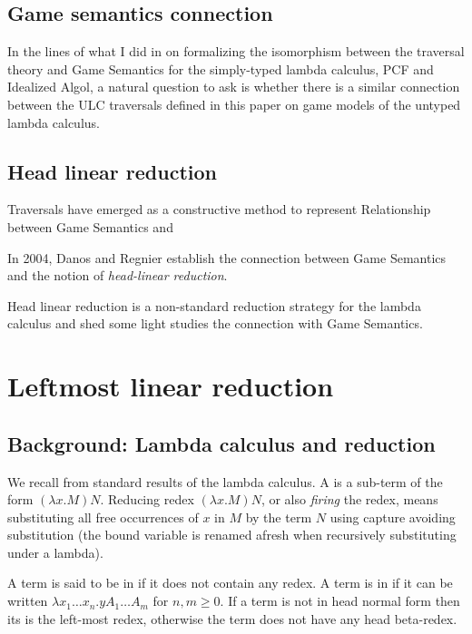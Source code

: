 \documentclass{article}
\theoremstyle{definition}
\begin{document}
\subsection{Game semantics connection}

In the lines of what I did in \cite{BlumPhd} on formalizing the isomorphism between the traversal theory and Game Semantics for the simply-typed lambda calculus, PCF and Idealized Algol, a natural question to ask is whether there is a similar connection between the ULC traversals defined in this paper on game models of the untyped lambda calculus.


\subsection{Head linear reduction}

Traversals have emerged as a constructive method to represent
Relationship between Game Semantics and

In 2004, Danos and Regnier \cite{danos-head} establish the connection between Game Semantics and the notion of \emph{head-linear reduction}.

Head linear reduction is  a non-standard reduction strategy for the lambda calculus and shed some light studies the connection with Game Semantics.


\section{Leftmost linear reduction}
\label{sec:leftmostlinearred}

\subsection{Background: Lambda calculus and reduction}
We recall from standard results of the lambda calculus.
A  is a sub-term of the form $(\lambda x. M) N$.
Reducing redex $(\lambda x. M) N$, or also \emph{firing} the redex, means substituting all free occurrences of $x$ in $M$ by the term $N$ using capture avoiding substitution (the bound variable is renamed afresh when recursively substituting under a lambda).

A term is said to be in  if it does not contain any redex.
A term is in  if it can be written $\lambda x_1 \ldots x_n . y A_1 \ldots A_m$ for $n,m\geq0$. If a term is not in head normal form then its  is the left-most redex, otherwise the term does not have any head beta-redex.
\end{document}
